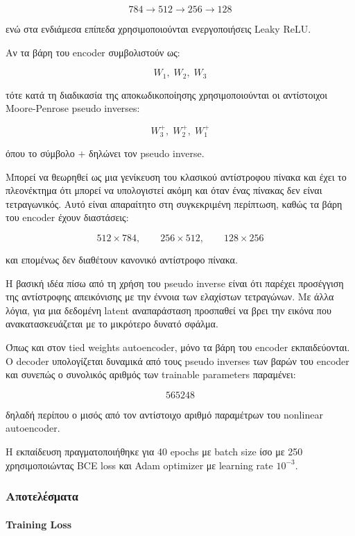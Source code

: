 \documentclass[12pt]{article}
\begin{document}
\begin{equation}
784 \rightarrow 512 \rightarrow 256 \rightarrow 128
\end{equation}

ενώ στα ενδιάμεσα επίπεδα χρησιμοποιούνται ενεργοποιήσεις Leaky ReLU.

Αν τα βάρη του encoder συμβολιστούν ως:

\[
W_1,\;W_2,\;W_3
\]

τότε κατά τη διαδικασία της αποκωδικοποίησης χρησιμοποιούνται οι αντίστοιχοι Moore-Penrose pseudo inverses:

\[
W_3^{+},\;W_2^{+},\;W_1^{+}
\]

όπου το σύμβολο \(+\) δηλώνει τον pseudo inverse.

Μπορεί να θεωρηθεί ως μια γενίκευση του κλασικού αντίστροφου πίνακα και έχει το πλεονέκτημα ότι μπορεί να υπολογιστεί ακόμη και όταν ένας 
πίνακας δεν είναι τετραγωνικός. Αυτό είναι απαραίτητο στη συγκεκριμένη περίπτωση, καθώς τα βάρη του encoder έχουν διαστάσεις:

\[
512 \times 784,
\qquad
256 \times 512,
\qquad
128 \times 256
\]

και επομένως δεν διαθέτουν κανονικό αντίστροφο πίνακα.

Η βασική ιδέα πίσω από τη χρήση του pseudo inverse είναι ότι παρέχει  προσέγγιση της αντίστροφης απεικόνισης με την έννοια των ελαχίστων τετραγώνων. 
Με άλλα λόγια, για μια δεδομένη latent αναπαράσταση προσπαθεί να βρει την εικόνα που ανακατασκευάζεται με το μικρότερο δυνατό σφάλμα.

Όπως και στον tied weights autoencoder, μόνο τα βάρη του encoder εκπαιδεύονται. Ο decoder υπολογίζεται δυναμικά από τους pseudo inverses των 
βαρών του encoder και συνεπώς ο συνολικός αριθμός των trainable parameters παραμένει:

\[
565248
\]

δηλαδή περίπου ο μισός από τον αντίστοιχο αριθμό παραμέτρων του nonlinear autoencoder.

Η εκπαίδευση πραγματοποιήθηκε για 40 epochs με batch size ίσο με 250 χρησιμοποιώντας BCE loss και Adam optimizer με learning rate \(10^{-3}\).

\subsubsection{Αποτελέσματα}
\paragraph{Training Loss}
\mbox{}\\
\end{document}
